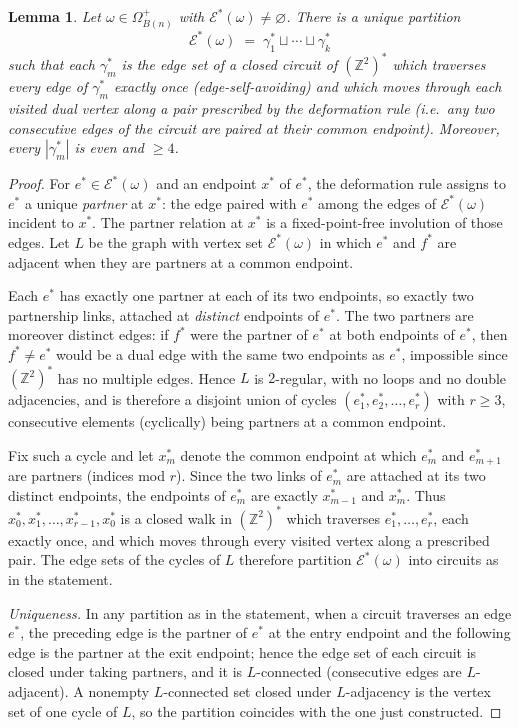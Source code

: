 \documentclass[11pt]{article}
\theoremstyle{plain}
\newtheorem{lemma}[theorem]{Lemma}
\theoremstyle{definition}
\theoremstyle{remark}
\newcommand{\Z}{\mathbb{Z}}
\newcommand{\dualZ}{(\Z^2)^*}       %
\newcommand{\dedges}{\mathscr{E}^*} %
\begin{document}
\begin{lemma}\label{lem:contour-decomp}
Let $\omega\in\Omega^{+}_{B(n)}$ with $\dedges(\omega)\neq\varnothing$.
There is a unique partition
\[
  \dedges(\omega)\;=\;\gamma_1^*\sqcup\cdots\sqcup\gamma_k^*
\]
such that each $\gamma_m^*$ is the edge set of a closed circuit of $\dualZ$
which traverses every edge of $\gamma_m^*$ exactly once
(edge-self-avoiding) and which moves through each visited dual vertex along
a pair prescribed by the deformation rule (i.e.\ any two consecutive edges
of the circuit are paired at their common endpoint). Moreover, every
$|\gamma_m^*|$ is even and $\ge 4$.
\end{lemma}

\begin{proof}
For $e^*\in\dedges(\omega)$ and an endpoint $x^*$ of $e^*$, the deformation
rule assigns to $e^*$ a unique \emph{partner} at $x^*$: the edge paired with
$e^*$ among the edges of $\dedges(\omega)$ incident to $x^*$. The partner
relation at $x^*$ is a fixed-point-free involution of those edges. Let $L$
be the graph with vertex set $\dedges(\omega)$ in which $e^*$ and $f^*$ are
adjacent when they are partners at a common endpoint.

Each $e^*$ has exactly one partner at each of its two endpoints, so exactly
two partnership links, attached at \emph{distinct} endpoints of $e^*$.
The two partners are moreover distinct edges: if $f^*$ were the partner of
$e^*$ at both endpoints of $e^*$, then $f^*\neq e^*$ would be a dual edge
with the same two endpoints as $e^*$, impossible since $\dualZ$ has no
multiple edges. Hence $L$ is $2$-regular, with no loops and no double
adjacencies, and is therefore a disjoint union of cycles
$(e_1^*,e_2^*,\dots,e_r^*)$ with $r\ge3$, consecutive elements (cyclically)
being partners at a common endpoint.

Fix such a cycle and let $x_m^*$ denote the common endpoint at which
$e_m^*$ and $e_{m+1}^*$ are partners (indices mod $r$). Since the two links
of $e_m^*$ are attached at its two distinct endpoints, the endpoints of
$e_m^*$ are exactly $x_{m-1}^*$ and $x_m^*$. Thus
$x_0^*,x_1^*,\dots,x_{r-1}^*,x_0^*$ is a closed walk in $\dualZ$ which
traverses $e_1^*,\dots,e_r^*$, each exactly once, and which moves through
every visited vertex along a prescribed pair. The edge sets of the cycles
of $L$ therefore partition $\dedges(\omega)$ into circuits as in the
statement.

\emph{Uniqueness.} In any partition as in the statement, when a circuit
traverses an edge $e^*$, the preceding edge is the partner of $e^*$ at the
entry endpoint and the following edge is the partner at the exit endpoint;
hence the edge set of each circuit is closed under taking partners, and it
is $L$-connected (consecutive edges are $L$-adjacent). A nonempty
$L$-connected set closed under $L$-adjacency is the vertex set of one cycle
of $L$, so the partition coincides with the one just constructed.


\end{proof}
\end{document}
